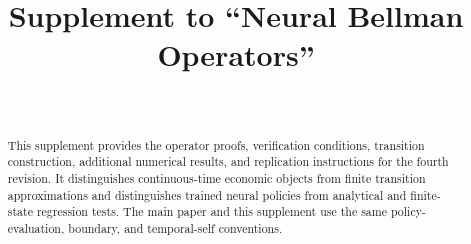\documentclass[ecta]{econsocart}
\begin{document}
\begin{frontmatter}
\title{Supplement to ``Neural Bellman Operators''}
\begin{aug}
\author[id=au1,addressref={add1}]{~}
\address[id=add1]{}
\end{aug}
\begin{abstract}
This supplement provides the operator proofs, verification conditions, transition construction, additional numerical results, and replication instructions for the fourth revision. It distinguishes continuous-time economic objects from finite transition approximations and distinguishes trained neural policies from analytical and finite-state regression tests. The main paper and this supplement use the same policy-evaluation, boundary, and temporal-self conventions.
\end{abstract}
\end{frontmatter}







\end{document}
